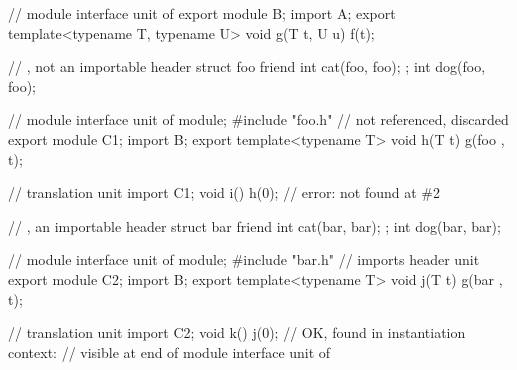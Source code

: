 \begin{std.txt}
\begin{codeblock}
// module interface unit of 
export module B;
import A;
export template<typename T, typename U>
void g(T t, U u) {
  f(t);
}

// , not an importable header
struct foo {
  friend int cat(foo, foo);
};
int dog(foo, foo);

// module interface unit of 
module;
#include "foo.h" //  not referenced, discarded
export module C1;
import B;
export template<typename T>
void h(T t) {
  g(foo{ }, t);
}

// translation unit
import C1;
void i() {
   h(0);        // error:  not found at \#2
}

// , an importable header
struct bar {
  friend int cat(bar, bar);
};
int dog(bar, bar);

// module interface unit of 
module;
#include "bar.h" // imports header unit 
export module C2;
import B;
export template<typename T>
void j(T t) {
  g(bar{ }, t);
}

// translation unit
import C2;
void k() {
   j(0);        // OK,  found in instantiation context:
                // visible at end of module interface unit of 
}
\end{codeblock}
\exitexample
\end{std.txt}
